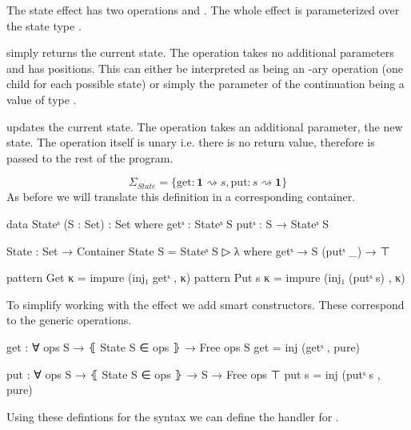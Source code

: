 The state effect has two operations  and .
The whole effect is parameterized over the state type .

 simply returns the current state.
The operation takes no additional parameters and has  positions.
This can either be interpreted as  being an
-ary operation (one child for each possible state) or simply the
parameter of the continuation being a value of type .

 updates the current state.
The operation takes an additional parameter, the new state.
The operation itself is unary i.e. there is no return value, therefore
 is passed to the rest of the program.

$$
\Sigma_{State} = \{ \mathrm{get} : \mathbf{1} \rightsquigarrow s, \mathrm{put} :
s \rightsquigarrow \mathbf{1} \}
$$
As before we will translate this definition in a corresponding container.

\begin{code}
data Stateˢ (S : Set) : Set where
  getˢ : Stateˢ S
  putˢ : S → Stateˢ S

State : Set → Container
State S = Stateˢ S ▷ λ where
  getˢ      → S
  (putˢ _)  → ⊤

pattern Get κ  = impure (inj₁ getˢ , κ)
pattern Put s κ  = impure (inj₁ (putˢ s) , κ)
\end{code}
To simplify working with the  effect we add smart
constructors.
These correspond to the generic operations.

\begin{code}
get : ∀ {ops S} → ⦃ State S ∈ ops ⦄ → Free ops S
get = inj (getˢ , pure)

put : ∀ {ops S} → ⦃ State S ∈ ops ⦄ → S → Free ops ⊤
put s = inj (putˢ s , pure)
\end{code}
Using these defintions for the syntax we can define the handler for
.

